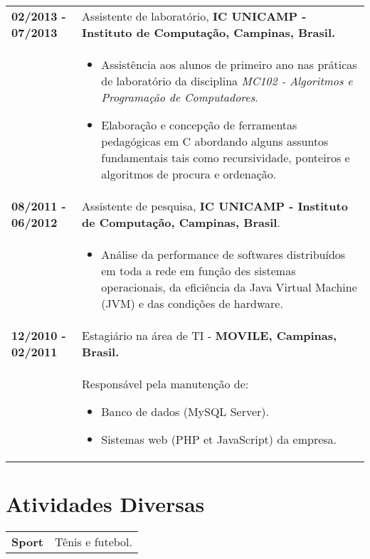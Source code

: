 \documentclass[10pt, a4paper]{article}
\begin{document}
\begin{tabular}{p{} p{}}
 \textbf{02/2013 - 07/2013}   & Assistente de laboratório, \textbf{IC
 UNICAMP - Instituto de Computação, Campinas, Brasil.} \\
  & \vspace{-12pt}
  \begin{itemize}
    \item Assistência aos alunos de primeiro ano nas práticas de laboratório da
    disciplina \textit{MC102 - Algoritmos e Programação de Computadores}.
    \vspace{-8pt}
    \item Elaboração e concepção de ferramentas pedagógicas em C
    abordando alguns assuntos fundamentais tais como recursividade, ponteiros e
    algoritmos de procura e ordenação.
	\end{itemize}\\

 \textbf{08/2011 - 06/2012} & Assistente de pesquisa, \textbf{IC UNICAMP -
 Instituto de Computação, Campinas, Brasil}. \\
 & \vspace{-12pt}
 \begin{itemize}
 	\item Análise da performance de softwares distribuídos em toda a rede em
 	função des sistemas operacionais, da eficiência da Java Virtual Machine (JVM)
 	e das condições de hardware.
 	\end{itemize}
 \\
 
 
 \textbf{12/2010 - 02/2011} & Estagiário na área de TI - \textbf{MOVILE,
 Campinas, Brasil.}
 \\  & Responsável pela manutenção de: \vspace{-8pt}
 \begin{itemize}
   \item Banco de dados (MySQL Server). \vspace{-8pt}
   \item Sistemas web (PHP et JavaScript) da empresa.
 \end{itemize} 
\end{tabular}



\section{Atividades Diversas}

\begin{tabular}{p{} p{}}

\textbf{Sport} & Tênis e futebol. \\

\end{tabular}

\end{document}
